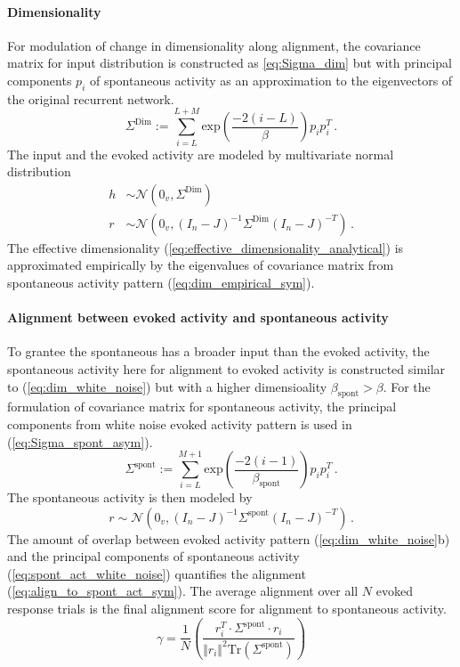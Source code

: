 \documentclass[11pt]{article}
\begin{document}
	\paragraph{Dimensionality} For modulation of change in dimensionality along alignment, the covariance matrix for input distribution is constructed as \ref{eq:Sigma_dim} but with principal components $p_i$ of spontaneous activity as an approximation to the eigenvectors of the original recurrent network.  
		\begin{equation}
			\Sigma^{\text{Dim}} := \sum_{i=L}^{L+M} \text{exp}\left(\frac{-2(i-L)}{\beta}\right) p_i p_i^T \, .
		\end{equation}
	The input and the evoked activity are modeled by multivariate normal distribution 
		\begin{subequations} \label{eq:dim_white_noise}
			\begin{align}
				h & \sim \mathcal{N}(0_v, \Sigma^{\text{Dim}}) \\
				r & \sim \mathcal{N}(0_v, (I_n - J)^{-1} \Sigma^{\text{Dim}} (I_n - J)^{-T}) \,.
			\end{align}
		\end{subequations}
	The effective dimensionality (\ref{eq:effective_dimensionality_analytical}) is approximated empirically by the eigenvalues of covariance matrix from spontaneous activity pattern (\ref{eq:dim_empirical_sym}). 
	
	\paragraph{Alignment between evoked activity and spontaneous activity}  To grantee the spontaneous has a broader input than the evoked activity, the spontaneous activity here for alignment to evoked activity is constructed similar to (\ref{eq:dim_white_noise}) but with a higher dimensioality $\beta_{\text{spont}} > \beta$. For the formulation of covariance matrix for spontaneous activity, the principal components from white noise evoked activity pattern is used in (\ref{eq:Sigma_spont_asym}). 
		\begin{equation}
			\Sigma^{\text{spont}} := \sum_{i=L}^{M+1} \text{exp}\left(\frac{-2(i-1)}{\beta_{\text{spont}}}\right) p_i p_i^T \, .
		\end{equation}
	The spontaneous activity is then modeled by
		\begin{equation} \label{eq:spont_act_white_noise}
			r \sim \mathcal{N}(0_v, (I_n - J)^{-1} \Sigma^{\text{spont}} (I_n - J)^{-T}) \,. 
		\end{equation}
	The amount of overlap between evoked activity pattern (\ref{eq:dim_white_noise}b) and the principal components of spontaneous activity (\ref{eq:spont_act_white_noise}) quantifies the alignment (\ref{eq:align_to_spont_act_sym}). The average alignment over all $N$ evoked response trials is the final alignment score for alignment to spontaneous activity.
		\begin{equation}
			\gamma = \frac{1}{N} \left(\frac{r^T_{i} \cdot \Sigma^{\text{spont}} \cdot r_{i}}{\Vert r_{i} \Vert^2 \text{Tr}(\Sigma^{\text{spont}} )}\right)
		\end{equation}
	
\end{document}
